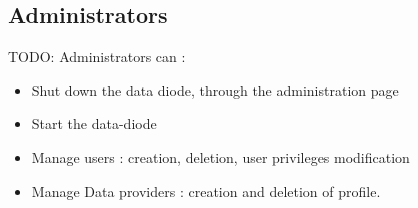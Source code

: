 \documentclass[a4paper,11pt]{article}
\begin{document}
\subsection{Administrators}
TODO:
Administrators can :
\begin{itemize}
\item{Shut down the data diode, through the administration page}
\item{Start the data-diode}
\item{Manage users : creation, deletion, user privileges modification}
\item{Manage Data providers : creation and deletion of profile.}
\end{itemize}
\end{document}
